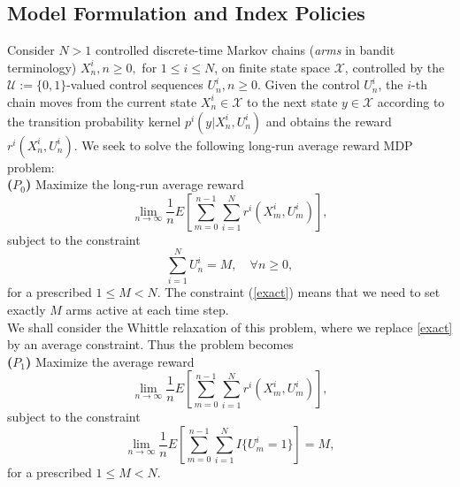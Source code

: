 \documentclass[12pt]{article}
\numberwithin{equation}{section}
\newcommand{\1}{\textbf{1}}
\newcommand{\U}{\mathcal{U}}
\newcommand{\X}{\mathcal{X}}
\begin{document}


\subsection{Model Formulation and Index Policies}
\label{sec:model}

Consider $N>1$ controlled discrete-time Markov chains ({\it arms} in bandit terminology) $X^i_n, n \geq 0,$ for $1\leq i \leq N$, 
on finite state space $\X$, controlled by the $\U := \{0,1\}$-valued control sequences $U^i_n, n \geq 0$. Given the control $U^i_n$, 
the $i$-th chain moves from the current state $X^i_n \in \X$ to the next state $y \in \X$ according to the transition probability 
kernel $p^i(y|X^i_n,U^i_n)$ and obtains the reward $r^i(X^i_n,U^i_n)$. 
We seek to solve the following long-run average reward MDP problem:\\

\noindent \textbf{($P_0$)} Maximize the long-run average reward
\begin{equation}
\lim_{n\to\infty}\frac{1}{n}E\left[\sum_{m=0}^{n-1}\sum_{i=1}^N r^i(X^i_m,U^i_m)\right], \label{MDP0}
\end{equation}
subject to the constraint
\begin{equation}
\sum_{i=1}^N U^i_n = M, \quad \forall n \geq 0, \label{exact}
\end{equation}
for a prescribed $1 \leq M < N$. The constraint (\ref{exact}) means that we need to set exactly
$M$ arms active at each time step.\\

We shall consider the Whittle relaxation \cite{Whittle} of this problem, 
where we replace \eqref{exact} by an average constraint. Thus the problem becomes\\

\noindent \textbf{($P_1$)}  Maximize the average reward
\begin{equation}
\lim_{n\to\infty}\frac{1}{n}E\left[\sum_{m=0}^{n-1}\sum_{i=1}^N r^i(X^i_m,U^i_m)\right], \label{MDP0}
\end{equation}
subject to the constraint
\begin{equation}
\lim_{n\to\infty}\frac{1}{n}E\left[\sum_{m=0}^{n-1}\sum_{i=1}^N I\{U^i_m=1\}\right] = M, \label{constraint}
\end{equation}
for a prescribed $1 \leq M < N$. \\
\end{document}
